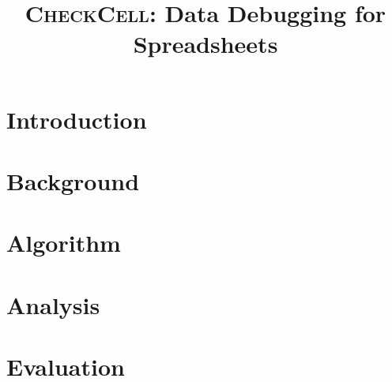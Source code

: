 \documentclass{sigplanconf}
\newcommand{\checkcell}{\textsc{CheckCell}}
\begin{document}
\copyrightdata{[to be supplied]} 


\title{\checkcell{}: Data Debugging for Spreadsheets}



\maketitle

\begin{abstract}

\end{abstract}




\section{Introduction}


\section{Background}
\label{sec:background}


\section{Algorithm}
\label{sec:algorithm}


\section{Analysis}
\label{sec:analysis}


\section{Evaluation}
\label{sec:evaluation}

\end{document}
